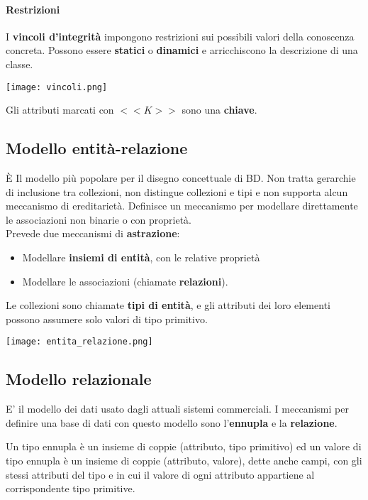 \paragraph{Restrizioni}
I \textbf{vincoli d'integrità} impongono restrizioni sui possibili valori della conoscenza concreta. Possono essere \textbf{statici} o \textbf{dinamici} e arricchiscono la descrizione di una classe.
\begin{center}
	\texttt{[image: vincoli.png]}
\end{center}

\begin{note}
	Gli attributi marcati con $<<K>>$ sono una \textbf{chiave}.
\end{note}

\subsection{Modello entità-relazione}
È Il modello più popolare per il disegno concettuale di BD. Non tratta gerarchie di inclusione tra collezioni, non distingue collezioni e tipi e non supporta alcun meccanismo di ereditarietà. Definisce un meccanismo per modellare direttamente le associazioni non binarie o con proprietà.\\
Prevede due meccanismi di \textbf{astrazione}:
\begin{itemize}
	\item Modellare \textbf{insiemi di entità}, con le relative proprietà
	\item Modellare le associazioni (chiamate \textbf{relazioni}).
\end{itemize}
Le collezioni sono chiamate \textbf{tipi di entità}, e gli attributi dei loro elementi possono assumere solo valori di tipo primitivo.
\begin{center}
	\texttt{[image: entita\_relazione.png]}
\end{center}
\subsection{Modello relazionale}
E’ il modello dei dati usato dagli attuali sistemi commerciali. I meccanismi per definire una base di dati con questo modello sono l’\textbf{ennupla} e la \textbf{relazione}.

\begin{definition}[Ennupla]
	Un tipo ennupla è un insieme di coppie (attributo, tipo primitivo) ed un valore di tipo	ennupla è un insieme di coppie (attributo, valore), dette anche campi, con gli stessi attributi del tipo e in cui il valore di ogni attributo appartiene al corrispondente tipo	primitive.
\end{definition}

